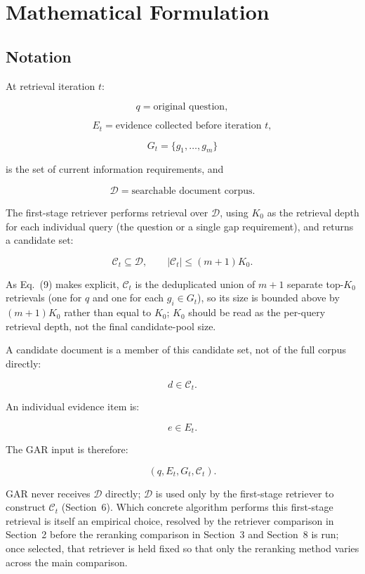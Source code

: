 \documentclass[11pt,a4paper]{article}
\begin{document}
\section{Mathematical Formulation}

\subsection{Notation}

At retrieval iteration $t$:

\[
q=\text{original question},
\]

\[
E_t=\text{evidence collected before iteration }t,
\]

\[
G_t=\{g_1,\ldots,g_m\}
\]

is the set of current information requirements, and

\[
\mathcal{D}=\text{searchable document corpus}.
\]

The first-stage retriever performs retrieval over $\mathcal{D}$, using $K_0$ as the retrieval depth for each individual query (the question or a single gap requirement), and returns a candidate set:

\[
\mathcal{C}_t\subseteq \mathcal{D},
\qquad
|\mathcal{C}_t|\le (m+1)K_0.
\]

As Eq.~(9) makes explicit, $\mathcal{C}_t$ is the deduplicated union of $m+1$ separate top-$K_0$ retrievals (one for $q$ and one for each $g_i\in G_t$), so its size is bounded above by $(m+1)K_0$ rather than equal to $K_0$; $K_0$ should be read as the per-query retrieval depth, not the final candidate-pool size.

A candidate document is a member of this candidate set, not of the full corpus directly:

\[
d\in\mathcal{C}_t.
\]

An individual evidence item is:

\[
e\in E_t.
\]

The GAR input is therefore:

\[
\boxed{(q,E_t,G_t,\mathcal{C}_t)}.
\]

GAR never receives $\mathcal{D}$ directly; $\mathcal{D}$ is used only by the first-stage retriever to construct $\mathcal{C}_t$ (Section~6). Which concrete algorithm performs this first-stage retrieval is itself an empirical choice, resolved by the retriever comparison in Section~2 before the reranking comparison in Section~3 and Section~8 is run; once selected, that retriever is held fixed so that only the reranking method varies across the main comparison.
\end{document}
